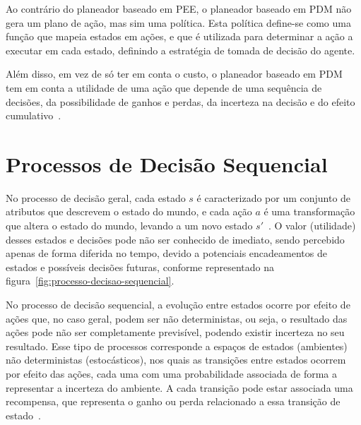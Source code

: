 Ao contrário do planeador baseado em PEE, o planeador baseado em PDM não gera um plano de ação, mas sim uma política.
Esta política define-se como uma função que mapeia estados em ações, e que é utilizada para determinar a ação a executar em cada estado, definindo a estratégia de tomada de decisão do agente.

Além disso, em vez de só ter em conta o custo, o planeador baseado em PDM tem em conta a utilidade de uma ação que depende de uma sequência de decisões, da possibilidade de ganhos e perdas, da incerteza na decisão e do efeito cumulativo~\cite{isel:iasa:slides:processos-decisao-sequencial}.


\section{Processos de Decisão Sequencial}\label{sec:processos-de-decisao-sequencial}

No processo de decisão geral, cada estado $s$ é caracterizado por um conjunto de atributos que descrevem o estado do mundo, e cada ação $a$ é uma transformação que altera o estado do mundo, levando a um novo estado $s'$~\cite{isel:iasa:slides:processos-decisao-sequencial}.
O valor (utilidade) desses estados e decisões pode não ser conhecido de imediato, sendo percebido apenas de forma diferida no tempo, devido a potenciais encadeamentos de estados e possíveis decisões futuras, conforme representado na figura~\ref{fig:processo-decisao-sequencial}.

No processo de decisão sequencial, a evolução entre estados ocorre por efeito de ações que, no caso geral, podem ser não deterministas, ou seja, o resultado das ações pode não ser completamente previsível, podendo existir incerteza no seu resultado.
Esse tipo de processos corresponde a espaços de estados (ambientes) não deterministas (estocásticos), nos quais as transições entre estados ocorrem por efeito das ações, cada uma com uma probabilidade associada de forma a representar a incerteza do ambiente. A cada transição pode estar associada uma recompensa, que representa o ganho ou perda relacionado a essa transição de estado~\cite{isel:iasa:slides:processos-decisao-sequencial}.

